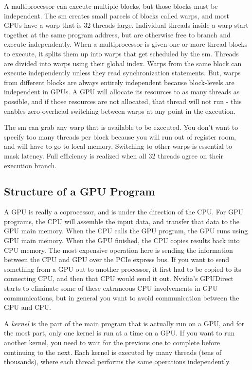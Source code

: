\documentclass[10pt]{article}
\begin{document}
\begin{flushleft}
A multiprocessor can execute multiple blocks, but those blocks must be independent. The \gls{sm} creates small parcels of blocks called warps, and most GPUs have a warp that is 32 threads large. Individual threads inside a warp start together at the same program address, but are otherwise free to branch and execute independently. When a multiprocessor is given one or more thread blocks to execute, it splits them up into warps that get scheduled by the \gls{sm}. Threads are divided into warps using their global index. Warps from the same block can execute independently unless they read synchronization statements. But, warps from different blocks are always entirely independent because block-levels are independent in GPUs. A GPU will allocate its resources to as many threads as possible, and if those resources are not allocated, that thread will not run - this enables zero-overhead switching between warps at any point in the execution.  

The \gls{sm} can grab any warp that is available to be executed. You don't want to specify too many threads per block because you will run out of register room, and will have to go to local memory. Switching to other warps is essential to mask latency. Full efficiency is realized when all 32 threads agree on their execution branch.

\subsection{Structure of a GPU Program}
A GPU is really a coprocessor, and is under the direction of the CPU. For GPU programs, the CPU will assemble the input data, and transfer that data to the GPU main memory. When the CPU calls the GPU program, the GPU runs using GPU main memory. When the GPU finished, the CPU copies results back into CPU memory. The most expensive operation here is sending the information between the CPU and GPU over the PCIe express bus. If you want to send something from a GPU out to another processor, it first had to be copied to its connecting CPU, and then that CPU would send it out. Nvidia's GPUDirect starts to eliminate some of these extraneous CPU involvements in GPU communications, but in general you want to avoid communication between the GPU and CPU. 

A \textit{kernel} is the part of the main program that is actually run on a GPU, and for the most part, only one kernel is run at a time on a GPU. If you want to run another kernel, you need to wait for the previous one to complete before continuing to the next. Each kernel is executed by many threads (tens of thousands), where each thread performs the same operations independently.


\end{flushleft}
\end{document}
